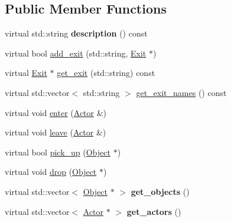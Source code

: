 \subsection*{Public Member Functions}
\begin{DoxyCompactItemize}
\item 
\hypertarget{classda__game_1_1Environment_a412ec5b8713e11bbee66dde20076ed2f}{
virtual std::string {\bfseries description} () const }
\label{classda__game_1_1Environment_a412ec5b8713e11bbee66dde20076ed2f}

\item 
virtual bool \hyperlink{classda__game_1_1Environment_a7b8062cb2c63bb225225a9749da4e8cf}{add\_\-exit} (std::string, \hyperlink{classda__game_1_1Exit}{Exit} $\ast$)
\item 
virtual \hyperlink{classda__game_1_1Exit}{Exit} $\ast$ \hyperlink{classda__game_1_1Environment_ad0b26526cf4a76fa7827ab6cb539d98b}{get\_\-exit} (std::string) const 
\item 
virtual std::vector$<$ std::string $>$ \hyperlink{classda__game_1_1Environment_a1702d13f246e537540f1073a138a706d}{get\_\-exit\_\-names} () const 
\item 
virtual void \hyperlink{classda__game_1_1Environment_a194d9cfcdf2c86431d83dd5bc686c489}{enter} (\hyperlink{classda__game_1_1Actor}{Actor} \&)
\item 
virtual void \hyperlink{classda__game_1_1Environment_aed5b6d00da5afb0dae96bedcb9ee9642}{leave} (\hyperlink{classda__game_1_1Actor}{Actor} \&)
\item 
virtual bool \hyperlink{classda__game_1_1Environment_a1160cb0cffc0f37e058f58457c76d12b}{pick\_\-up} (\hyperlink{classda__game_1_1Object}{Object} $\ast$)
\item 
virtual void \hyperlink{classda__game_1_1Environment_a4d1fb3198721b013f77b79cea398bd35}{drop} (\hyperlink{classda__game_1_1Object}{Object} $\ast$)
\item 
\hypertarget{classda__game_1_1Environment_aa961ca9cba24dd62107ddcb5c5b5ab29}{
virtual std::vector$<$ \hyperlink{classda__game_1_1Object}{Object} $\ast$ $>$ {\bfseries get\_\-objects} ()}
\label{classda__game_1_1Environment_aa961ca9cba24dd62107ddcb5c5b5ab29}

\item 
\hypertarget{classda__game_1_1Environment_ad5248ea56c5bf7038ae48d7326d361f4}{
virtual std::vector$<$ \hyperlink{classda__game_1_1Actor}{Actor} $\ast$ $>$ {\bfseries get\_\-actors} ()}
\label{classda__game_1_1Environment_ad5248ea56c5bf7038ae48d7326d361f4}

\end{DoxyCompactItemize}
